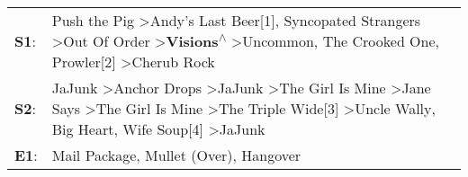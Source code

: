 \begin{supertabular}{p{0.03\textwidth}p{0.92\textwidth}}
 \textbf{S1}:  &                                                                                      Push the Pig\textsuperscript{} \textgreater \enspace Andy's Last Beer[1]\textsuperscript{}, \enspace Syncopated Strangers\textsuperscript{} \textgreater \enspace Out Of Order\textsuperscript{} \textgreater \enspace \textbf{Visions\textsuperscript{$\wedge$}} \textgreater \enspace Uncommon\textsuperscript{}, \enspace The Crooked One\textsuperscript{}, \enspace Prowler[2]\textsuperscript{} \textgreater \enspace Cherub Rock\textsuperscript{}  \enspace  \\
 \textbf{S2}:  &  JaJunk\textsuperscript{} \textgreater \enspace Anchor Drops\textsuperscript{} \textgreater \enspace JaJunk\textsuperscript{} \textgreater \enspace The Girl Is Mine\textsuperscript{} \textgreater \enspace Jane Says\textsuperscript{} \textgreater \enspace The Girl Is Mine\textsuperscript{} \textgreater \enspace The Triple Wide[3]\textsuperscript{} \textgreater \enspace Uncle Wally\textsuperscript{}, \enspace Big Heart\textsuperscript{}, \enspace Wife Soup[4]\textsuperscript{} \textgreater \enspace JaJunk\textsuperscript{}  \enspace  \\
 \textbf{E1}:  &                                                                                                                                                                                                                                                                                                                                                                                                                                  Mail Package\textsuperscript{}, \enspace Mullet (Over)\textsuperscript{}, \enspace Hangover\textsuperscript{}  \enspace  \\
\end{supertabular}
